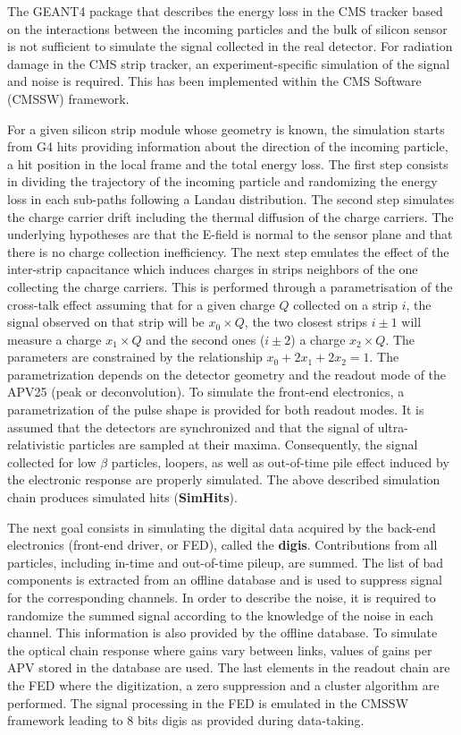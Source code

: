 The GEANT4 package that describes the energy loss in the CMS tracker based on the interactions between the incoming particles and the bulk of silicon sensor is not sufficient to simulate the signal collected in the real detector.
For radiation damage in the CMS strip tracker, an experiment-specific simulation of the signal and noise is required. This has been implemented within the CMS Software (CMSSW) framework.

For a given silicon strip module whose geometry is known, the simulation \cite{Ranieri:1103455} starts from G4 hits providing information about the direction of the incoming particle, a hit position in the local frame and the total energy loss.
The first step consists in dividing the trajectory of the incoming particle and randomizing the energy loss in each sub-paths following a Landau distribution.
The second step simulates the charge carrier drift including the thermal diffusion of the charge carriers.
The underlying hypotheses are that the  E-field is normal to the sensor plane and that there is no charge collection inefficiency.
The next step emulates the effect of the inter-strip capacitance which induces charges in strips  neighbors of the one collecting the charge carriers.
This is performed through a parametrisation of the cross-talk effect
assuming that for a given charge $Q$ collected on a strip $i$, the signal observed on that strip will be $x_0\times Q$, the two closest strips $i\pm 1$ will measure a charge $x_1 \times Q$ and the second ones ($i\pm 2$) a charge $x_2 \times Q$.
The parameters are constrained by the relationship $x_0+2x_1+2x_2 = 1$.
The parametrization depends on the detector geometry and the readout mode of the APV25 (peak or deconvolution).
To simulate the front-end electronics, a parametrization of the pulse shape is provided for both readout modes.
It is assumed that the detectors are synchronized and that the signal of ultra-relativistic particles are sampled at their maxima.
Consequently, the signal collected for low $\beta$ particles, loopers, as well as out-of-time pile effect induced by the electronic response are properly simulated.
The above described simulation chain produces simulated hits ({\bf SimHits}).

The next goal consists in simulating the digital data acquired by the back-end electronics (front-end driver, or FED), called the {\bf digis}.
Contributions from all particles, including in-time and out-of-time pileup, are summed. The list of bad components is extracted from an offline database and is used to suppress signal for the corresponding channels.
In order to describe the noise, it is required to randomize the summed signal according to the knowledge of the noise in each channel.
This information is also provided by the offline database. 
To simulate the optical chain response where gains vary between links, values of 
gains per APV stored in the database are used.
The last elements in the readout chain are the FED where the digitization, a zero suppression and a cluster algorithm are performed.
The signal processing in the FED is emulated in the CMSSW framework leading to 8 bits digis as provided during data-taking.


